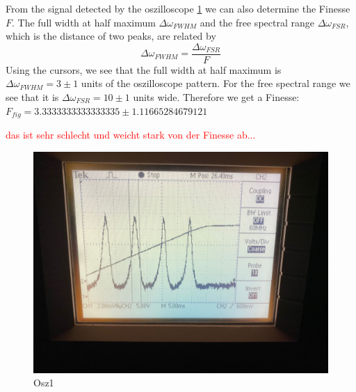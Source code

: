 \documentclass{article}
\begin{document}
From the signal detected by the oszilloscope \ref{Osz1} we can also determine the Finesse $F$. The full width at half maximum $\Delta\omega_{FWHM}$ and the free spectral range $\Delta\omega_{FSR}$, which is the distance of two peaks, are related by 
\begin{equation}
\Delta\omega_{FWHM} = \frac{\Delta\omega_{FSR}}{F}
\label{FinesseOszilloskopbild}
\end{equation}
Using the cursors, we see that the full width at half maximum is $\Delta\omega_{FWHM} =3 \pm 1$ units of the oszilloscope pattern. For the free spectral range we see that it is $\Delta\omega_{FSR} = 10 \pm 1$ units wide. Therefore we get a Finesse:\\
$F_{fig} = 3.3333333333333335 \pm 1.11665284679121$

\textcolor{red}{das ist sehr schlecht und weicht stark von der Finesse ab...}

\begin{figure}[h!]
\includegraphics[width=\textwidth]{oszilloskopbild.jpg}
\caption{Osz1}
\label{Osz1}
\end{figure}
\end{document}
